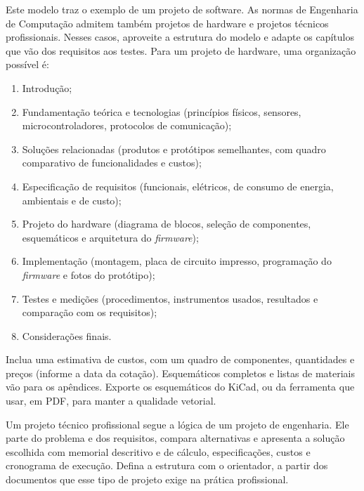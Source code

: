 \begin{instrucao}
Este modelo traz o exemplo de um projeto de software. As normas de Engenharia
de Computação admitem também projetos de hardware e projetos técnicos
profissionais. Nesses casos, aproveite a estrutura do modelo e adapte os
capítulos que vão dos requisitos aos testes. Para um projeto de hardware, uma
organização possível é:
\begin{enumerate}
  \item Introdução;
  \item Fundamentação teórica e tecnologias (princípios físicos, sensores,
        microcontroladores, protocolos de comunicação);
  \item Soluções relacionadas (produtos e protótipos semelhantes, com quadro
        comparativo de funcionalidades e custos);
  \item Especificação de requisitos (funcionais, elétricos, de consumo de
        energia, ambientais e de custo);
  \item Projeto do hardware (diagrama de blocos, seleção de componentes,
        esquemáticos e arquitetura do \emph{firmware});
  \item Implementação (montagem, placa de circuito impresso, programação do
        \emph{firmware} e fotos do protótipo);
  \item Testes e medições (procedimentos, instrumentos usados, resultados e
        comparação com os requisitos);
  \item Considerações finais.
\end{enumerate}
Inclua uma estimativa de custos, com um quadro de componentes, quantidades e
preços (informe a data da cotação). Esquemáticos completos e listas de
materiais vão para os apêndices. Exporte os esquemáticos do KiCad, ou da
ferramenta que usar, em PDF, para manter a qualidade vetorial.

Um projeto técnico profissional segue a lógica de um projeto de engenharia.
Ele parte do problema e dos requisitos, compara alternativas e apresenta a
solução escolhida com memorial descritivo e de cálculo, especificações, custos
e cronograma de execução. Defina a estrutura com o orientador, a partir dos
documentos que esse tipo de projeto exige na prática profissional.
\end{instrucao}
